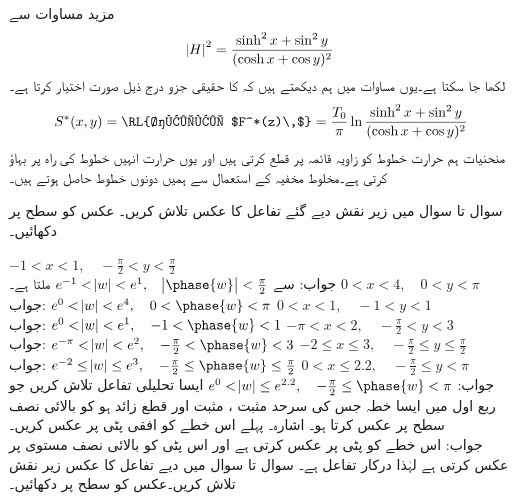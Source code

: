 مزید مساوات  سے
\begin{align*}
\abs{H}^2=\frac{\sinh^2x+\sin^2y}{(\cosh x+\cos y)^2}
\end{align*}
لکھا جا سکتا ہے۔یوں مساوات  میں ہم دیکھتے ہیں کہ  کا حقیقی جزو درج ذیل صورت اختیار کرتا ہے۔
\begin{align*}
S^*(x,y)=\text{\RL{حقیقی $F^*(z)\,$}}=\frac{T_0}{\pi}\ln \frac{\sinh^2x+\sin^2y}{(\cosh x+\cos y)^2}
\end{align*}
منحنیات  ہم حرارت خطوط  کو زاویہ قائمہ پر قطع کرتی ہیں اور یوں حرارت انہیں خطوط کی راہ  پر بہاؤ کرتی ہے۔مخلوط مخفیہ کے  استعمال سے ہمیں دونوں خطوط حاصل ہوتے ہیں۔

سوال  تا سوال  میں زیر نقش  دیے گئے تفاعل کا عکس تلاش کریں۔ عکس کو  سطح پر دکھائیں۔

\quad
$-1<x<1,\quad -\tfrac{\pi}{2}<y<\tfrac{\pi}{2}$\\
جواب:\quad
{} سے 
$e^{-1}<\abs{w}<e^1,\quad \abs{\phase{w}}<\tfrac{\pi}{2}$
ملتا ہے۔
\quad
$0<x<4,\quad 0<y<\pi$\\
جواب:\quad
$e^0<\abs{w}<e^4,\quad 0<\phase{w}<\pi$
\quad
$0<x<1,\quad -1<y<1$\\
جواب:\quad
$e^0<\abs{w}<e^1,\quad -1<\phase{w}<1$
\quad
$-\pi<x<2,\quad -\tfrac{\pi}{2}<y<3$\\
جواب:\quad
$e^{-\pi}<\abs{w}<e^2,\quad -\tfrac{\pi}{2}<\phase{w}<3$
\quad
$-2\le x\le 3,\quad -\tfrac{\pi}{2}\le y\le \tfrac{\pi}{2}$\\
جواب:\quad
$e^{-2}\le \abs{w}\le e^3,\quad -\tfrac{\pi}{2}\le \phase{w}\le \tfrac{\pi}{2}$
\quad
$0< x\le 2.2,\quad -\tfrac{\pi}{2}\le y< \pi$\\
جواب:\quad
$e^{0}< \abs{w}\le e^{2.2},\quad -\tfrac{\pi}{2}\le \phase{w}< \pi$
\quad
ایسا تحلیلی تفاعل تلاش کریں جو ربع اول میں ایسا خطہ جس کی سرحد مثبت ، مثبت  اور قطع زائد   ہو کو بالائی نصف سطح پر عکس کرتا ہو۔ اشارہ۔ پہلے اس خطے کو افقی پٹی پر عکس کریں۔\\
جواب:\quad
{} اس خطے کو  پٹی  پر عکس کرتی ہے اور  اس پٹی کو بالائی نصف مستوی پر عکس کرتی ہے لہٰذا درکار تفاعل  ہے۔
سوال  تا سوال  میں دیے تفاعل کا عکس زیر نقش  تلاش کریں۔عکس کو  سطح پر دکھائیں۔

